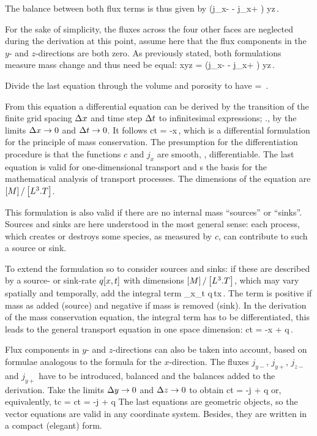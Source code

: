 The balance between both flux terms is thus given by
\beq
\theta\left(j_{x-} - j_{x+} \right) \diff y\diff z\,.
\eeq

For the sake of simplicity, the fluxes across the four other faces are neglected during the derivation at this point\ie, assume here that the flux components in the $y$- and $z$-directions are both zero. As previously stated, both formulations measure mass change and thus need be equal:
\beq
\theta{}\diff x\diff y\diff z
    = \theta\left(j_{x-} - j_{x+} \right) \diff y\diff z\,.
\eeq

Divide the last equation through the volume and porosity to have
\beq
{}
    = \,.
\eeq

From this equation a differential equation can be derived by the transition of the finite grid spacing $\Delta x$ and time step $\Delta t$ to infinitesimal expressions; \viz., by the limits $\Delta x\to 0$ and $\Delta t\to 0$. It follows
\beq
\xpd ct = -x\,,
\eeq
which is a differential formulation for the principle of mass conservation. The presumption for the differentiation procedure is that the functions $c$ and $j_x$ are smooth, \ie, differentiable. The last equation is valid for one-dimensional transport and s the basis for the mathematical analysis of transport processes. The dimensions of the equation are $\left[{M}\right]/\left[{L^3.T}\right]$.

This formulation is also valid if there are no internal mass ``sources'' or ``sinks''. Sources and sinks are here understood in the most general sense: each process, which creates or destroys some species, as measured by $c$, can contribute to such a source or sink.

To extend the formulation so to consider sources and sinks: if these are described by a source- or sink-rate $q\!\left[{x,t}\right]$ with dimensions $\left[{M}\right]/\left[{L^3.T}\right]$, which may vary spatially and temporally, add the integral term
\beq
\int_{\diff x}\int_{\diff t} q\,\dx t\dx x\,.
\eeq
The term is positive if mass as added (source) and negative if mass is removed (sink). In the derivation of the mass conservation equation, the integral term has to be differentiated, this leads to the general transport equation in one space dimension:
\beq
\theta\xpd ct = -x + q\,.
\eeq

Flux components in $y$- and $z$-directions can also be taken into account, based on formulae analogous to the formula for the $x$-direction. The fluxes $j_{y-}$, $j_{y+}$, $j_{z-}$ and $j_{y+}$ have to be introduced, balanced and the balances added to the derivation. Take the limits $\Delta y\to 0$ and $\Delta z\to 0$ to obtain
\beq
\theta\xpd ct = -\gder\iprod\theta j + q
\eeq
or, equivalently,
\beq
\theta\fpder tc = \theta\cder ct = -\div j + q
\eeq
The last equations are geometric objects, so the vector equations are valid in any coordinate system. Besides, they are written in a compact (elegant) form.

